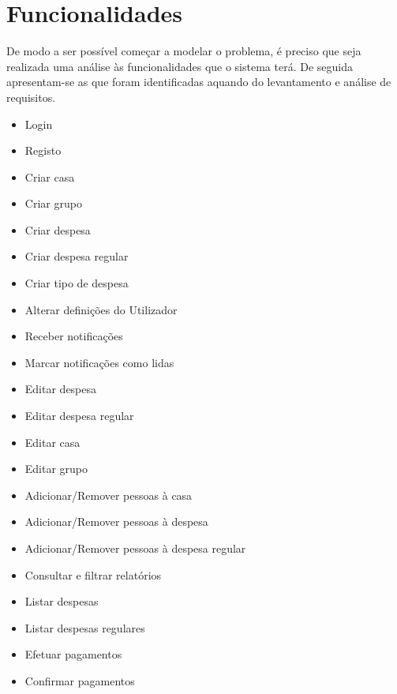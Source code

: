\section{Funcionalidades}

De modo a ser possível começar a modelar o problema, é preciso que seja realizada uma análise às funcionalidades que o sistema terá. De seguida apresentam-se as que foram identificadas aquando do levantamento e análise de requisitos.

\begin{itemize}
\item Login
\item Registo
\item Criar casa
\item Criar grupo
\item Criar despesa
\item Criar despesa regular
\item Criar tipo de despesa
\item Alterar definições do Utilizador
\item Receber notificações
\item Marcar notificações como lidas
\item Editar despesa
\item Editar despesa regular
\item Editar casa
\item Editar grupo
\item Adicionar/Remover pessoas à casa
\item Adicionar/Remover pessoas à despesa
\item Adicionar/Remover pessoas à despesa regular
\item Consultar e filtrar relatórios
\item Listar despesas
\item Listar despesas regulares
\item Efetuar pagamentos
\item Confirmar pagamentos
\end{itemize}